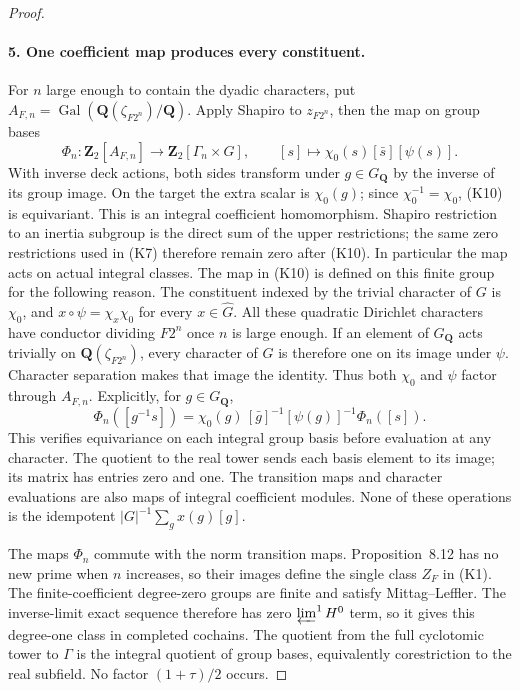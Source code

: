 \begin{proof}
\paragraph{5. One coefficient map produces every constituent.}
For $n$ large enough to contain the dyadic characters, put
$A_{F,n}=\operatorname{Gal}(\mathbf Q(\zeta_{F2^n})/\mathbf Q)$.
Apply Shapiro to $z_{F2^n}$, then the map on group bases
\[
 \Phi_n:\mathbf Z_2[A_{F,n}]\longrightarrow
                  \mathbf Z_2[\Gamma_n\times G],\qquad
 [s]\longmapsto\chi_0(s)[\bar s][\psi(s)].                 \tag{K10}
\]
With inverse deck actions, both sides transform under $g\in G_{\mathbf Q}$
by the inverse of its group image. On the target the extra scalar
is $\chi_0(g)$; since $\chi_0^{-1}=\chi_0$, (K10) is equivariant.
This is an integral coefficient homomorphism. Shapiro restriction
to an inertia subgroup is the direct sum of the upper restrictions;
the same zero restrictions used in (K7) therefore remain zero after
(K10). In particular the map acts on actual integral classes.
The map in (K10) is defined on this finite group for the following
reason. The constituent indexed by the trivial character of $G$ is
$\chi_0$, and
$x\circ\psi=\chi_x\chi_0$ for every $x\in\widehat G$.
All these quadratic Dirichlet characters have conductor dividing
$F2^n$ once $n$ is large enough. If an element of $G_{\mathbf Q}$
acts trivially on $\mathbf Q(\zeta_{F2^n})$, every character of $G$
is therefore one on its image under $\psi$. Character separation
makes that image the identity. Thus both $\chi_0$ and $\psi$
factor through $A_{F,n}$. Explicitly, for $g\in G_{\mathbf Q}$,
\[
 \Phi_n([g^{-1}s])
 =\chi_0(g)\,[\bar g]^{-1}[\psi(g)]^{-1}\Phi_n([s]).
\]
This verifies equivariance on each integral group basis before
evaluation at any character. The quotient to the real tower sends
each basis element to its image; its matrix has entries zero and
one. The transition maps and character evaluations are also maps
of integral coefficient modules. None of these operations is the
idempotent $|G|^{-1}\sum_g x(g)[g]$.


The maps $\Phi_n$ commute with the norm transition maps.
Proposition~8.12 has no new prime when $n$ increases, so their
images define the single class $Z_F$ in (K1).
The finite-coefficient degree-zero groups are finite and satisfy
Mittag--Leffler. The inverse-limit exact sequence
\cite[Corollary 4.1.3, p.~96]{nekovar} therefore has zero
$\varprojlim^1 H^0$ term, so it gives this degree-one class
in completed cochains.
The quotient from the full cyclotomic tower to $\Gamma$ is the
integral quotient of group bases, equivalently corestriction to
the real subfield. No factor $(1+\tau)/2$ occurs.


\end{proof}
